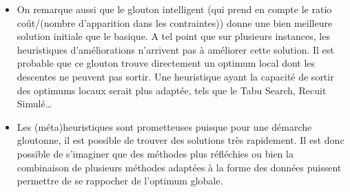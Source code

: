\begin{itemize}


\item On remarque aussi que le glouton intelligent (qui prend en compte le ratio coût/(nombre d'apparition dans les contraintes)) donne une bien meilleure solution initiale que le basique. A tel point que sur plusieurs instances, les heuristiques d'améliorations n'arrivent pas à améliorer cette solution. Il est probable que ce glouton trouve directement un optimum local dont les descentes ne peuvent pas sortir. Une heuristique ayant la capacité de sortir des optimums locaux serait plus adaptée, tels que le Tabu Search, Recuit Simulé\dots



\item Les (méta)heuristiques sont prometteuses puisque pour une démarche gloutonne, il est possible de trouver des solutions très rapidement. Il est donc possible de s'imaginer que des méthodes plus réfléchies ou bien la combinaison de plusieurs méthodes adaptées à la forme des données puissent permettre de se rappocher de l'optimum globale.

\vfill
\break
\end{itemize}
